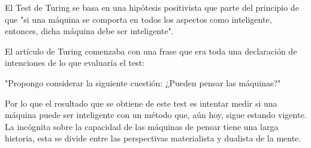 \documentclass[a4paper, 11pt]{article} %
\begin{document}
El Test de Turing se basa en una hipótesis positivista que parte del principio de que "si una máquina se comporta en todos los aspectos como inteligente, entonces, dicha máquina debe ser inteligente".

El artículo de Turing comenzaba con una frase que era toda una declaración de intenciones de lo que evaluaría el test:
\begin{shaded}
"Propongo considerar la siguiente cuestión: ¿Pueden pensar las máquinas?"
\end{shaded}

Por lo que el resultado que se obtiene de este test es intentar medir si una máquina puede ser inteligente con un método que, aún hoy, sigue estando vigente.\\

La incógnita sobre la capacidad de las máquinas de pensar tiene una larga historia, esta se divide entre las perspectivas materialista y dualista de la mente.
\end{document}
